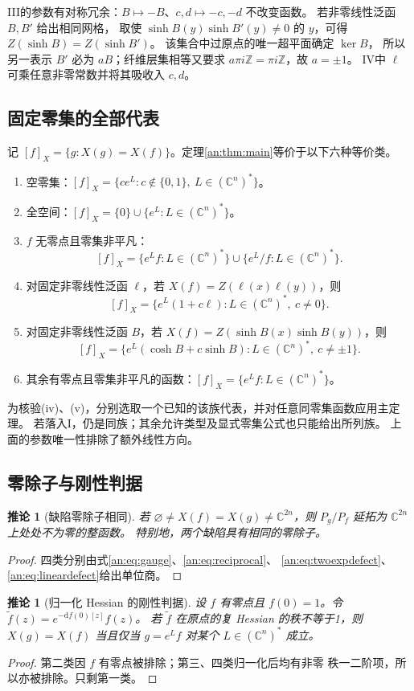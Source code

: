 \documentclass[11pt,a4paper,oneside,openany]{book}
\theoremstyle{lecture}
\newtheorem{corollary}[theorem]{推论}
\newcommand{\C}{\mathbb C}
\newcommand{\Z}{\mathbb Z}
\newcommand{\dd}{\mathrm d}
\newcommand{\e}{e}
\numberwithin{equation}{section}
\begin{document}
III的参数有对称冗余：$B\mapsto-B$、$c,d\mapsto-c,-d$ 不改变函数。
若非零线性泛函 $B,B'$ 给出相同网格，
取使 $\sinh B(y)\sinh B'(y)\ne0$ 的 $y$，可得 $Z(\sinh B)=Z(\sinh B')$。
该集合中过原点的唯一超平面确定 $\ker B$，
所以另一表示 $B'$ 必为 $aB$；纤维层集相等又要求 $a\pi i\Z=\pi i\Z$，故 $a=\pm1$。
IV中 $\ell$ 可乘任意非零常数并将其吸收入 $c,d$。

\subsection{固定零集的全部代表}
记 $[f]_X=\{g:X(g)=X(f)\}$。定理\ref{an:thm:main}等价于以下六种等价类。
\begin{enumerate}[label=(\roman*)]
\item 空零集：$[f]_X=\{ce^L:c\notin\{0,1\},\ L\in(\C^n)^*\}$。
\item 全空间：$[f]_X=\{0\}\cup\{e^L:L\in(\C^n)^*\}$。
\item $f$ 无零点且零集非平凡：
\[
 [f]_X=\{e^L f:L\in(\C^n)^*\}\cup\{e^L/f:L\in(\C^n)^*\}.
\]
\item 对固定非零线性泛函 $\ell$，若 $X(f)=Z(\ell(x)\ell(y))$，则
\[
 [f]_X=\{e^L(1+c\ell):L\in(\C^n)^*,\ c\ne0\}.
\]
\item 对固定非零线性泛函 $B$，若 $X(f)=Z(\sinh B(x)\sinh B(y))$，则
\[
 [f]_X=\{e^L(\cosh B+c\sinh B):L\in(\C^n)^*,\ c\ne\pm1\}.
\]
\item 其余有零点且零集非平凡的函数：$[f]_X=\{e^L f:L\in(\C^n)^*\}$。
\end{enumerate}
为核验(iv)、(v)，分别选取一个已知的该族代表，并对任意同零集函数应用主定理。
若落入I，仍是同族；其余允许类型及显式零集公式也只能给出所列族。
上面的参数唯一性排除了额外线性方向。

\subsection{零除子与刚性判据}
\begin{corollary}[缺陷零除子相同]\label{an:cor:unitquotient}
若 $\varnothing\ne X(f)=X(g)\ne\C^{2n}$，则
$P_g/P_f$ 延拓为 $\C^{2n}$ 上处处不为零的整函数。
特别地，两个缺陷具有相同的零除子。
\end{corollary}
\begin{proof}
四类分别由式\eqref{an:eq:gauge}、\eqref{an:eq:reciprocal}、
\eqref{an:eq:twoexpdefect}、\eqref{an:eq:lineardefect}给出单位商。
\end{proof}

\begin{corollary}[归一化 Hessian 的刚性判据]\label{an:cor:hessian}
设 $f$ 有零点且 $f(0)=1$。令 $\widetilde f(z)=\e^{-\dd f(0)[z]}f(z)$。
若 $\widetilde f$ 在原点的复 Hessian 的秩不等于1，则
$X(g)=X(f)$ 当且仅当 $g=\e^L f$ 对某个 $L\in(\C^n)^*$ 成立。
\end{corollary}
\begin{proof}
第二类因 $f$ 有零点被排除；第三、四类归一化后均有非零
秩一二阶项，所以亦被排除。只剩第一类。
\end{proof}
\end{document}

